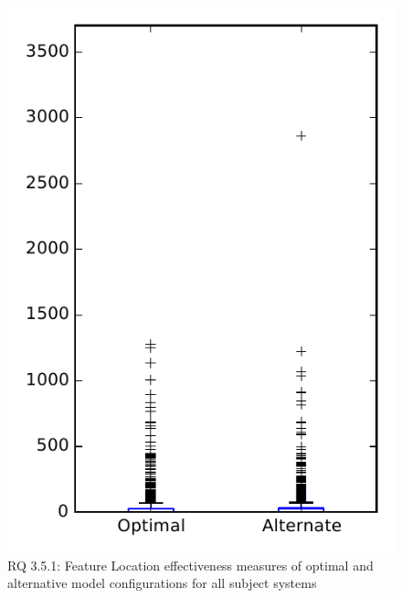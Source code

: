 
\begin{figure}
\centering
\includegraphics[height=0.4\textheight]{figures/combo/flt_rq1_overview}
\caption{RQ 3.5.1: Feature Location effectiveness measures of optimal and alternative model configurations for all subject systems}
\label{fig:combo:flt:rq1:overview}
\end{figure}
